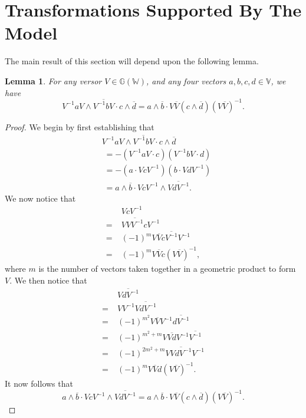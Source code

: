 \documentclass{birkjour}
\newtheorem{lem}[thm]{Lemma}
\theoremstyle{definition}
\theoremstyle{remark}
\numberwithin{equation}{section}
\newcommand{\G}{\mathbb{G}}
\newcommand{\V}{\mathbb{V}}
\newcommand{\W}{\mathbb{W}}
\begin{document}
\section{Transformations Supported By The Model}

The main result of this section will depend upon the following lemma.
\begin{lem}\label{lma_versor_transfer}
For any versor $V\in\G(\W)$, and any four vectors $a,b,c,d\in\V$, we have
\begin{equation}
V^{-1}aV\wedge\overline{V^{-1}bV}\cdot c\wedge\overline{d} =
a\wedge\overline{b}\cdot V\overline{V}(c\wedge\overline{d})(V\overline{V})^{-1}.
\end{equation}
\end{lem}
\begin{proof}
We begin by first establishing that
\begin{align}
 & V^{-1}aV\wedge\overline{V^{-1}bV}\cdot c\wedge\overline{d} \\
&\;= -(V^{-1}aV\cdot c)(V^{-1}bV\cdot d) \\
&\;= -(a\cdot VcV^{-1})(b\cdot VdV^{-1}) \\
&\;= a\wedge\overline{b}\cdot VcV^{-1}\wedge\overline{VdV^{-1}}.
\end{align}
We now notice that
\begin{align}
& VcV^{-1} \\
=\;& V\overline{VV^{-1}}cV^{-1} \\
=\;& (-1)^m V\overline{V}c\overline{V^{-1}}V^{-1} \\
=\;& (-1)^m V\overline{V}c(V\overline{V})^{-1},
\end{align}
where $m$ is the number of vectors taken together in a geometric
product to form $V$.  We then notice that
\begin{align}
& \overline{VdV^{-1}} \\
=\;& VV^{-1}\overline{VdV^{-1}} \\
=\;& (-1)^{m^2}V\overline{V}V^{-1}\overline{dV^{-1}} \\
=\;&(-1)^{m^2+m}V\overline{Vd}V^{-1}\overline{V^{-1}} \\
=\;&(-1)^{2m^2+m}V\overline{VdV^{-1}}V^{-1} \\
=\;&(-1)^mV\overline{V}d(V\overline{V})^{-1}.
\end{align}
It now follows that
\begin{equation}
a\wedge\overline{b}\cdot VcV^{-1}\wedge\overline{VdV^{-1}} =
a\wedge\overline{b}\cdot V\overline{V}(c\wedge\overline{d})(V\overline{V})^{-1}.
\end{equation}
\end{proof}
\end{document}
